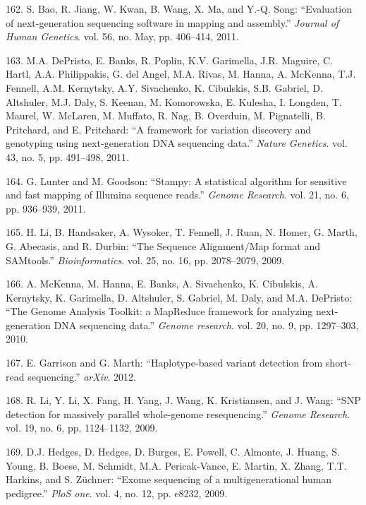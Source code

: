 \documentclass[12pt,a4paper,twoside]{ugathesis}
\theoremstyle{definition}
\theoremstyle{definition}
\theoremstyle{definition}
\theoremstyle{remark}
\begin{document}
\hypertarget{ref-Bao2011}{}
162. S. Bao, R. Jiang, W. Kwan, B. Wang, X. Ma, and Y.-Q. Song:
``Evaluation of next-generation sequencing software in mapping and
assembly.'' \emph{Journal of Human Genetics}. vol. 56, no. May, pp.
406--414, 2011.

\hypertarget{ref-DePristo2011}{}
163. M.A. DePristo, E. Banks, R. Poplin, K.V. Garimella, J.R. Maguire,
C. Hartl, A.A. Philippakis, G. del Angel, M.A. Rivas, M. Hanna, A.
McKenna, T.J. Fennell, A.M. Kernytsky, A.Y. Sivachenko, K. Cibulskis,
S.B. Gabriel, D. Altshuler, M.J. Daly, S. Keenan, M. Komorowska, E.
Kulesha, I. Longden, T. Maurel, W. McLaren, M. Muffato, R. Nag, B.
Overduin, M. Pignatelli, B. Pritchard, and E. Pritchard: ``A framework
for variation discovery and genotyping using next-generation DNA
sequencing data.'' \emph{Nature Genetics}. vol. 43, no. 5, pp. 491--498,
2011.

\hypertarget{ref-Lunter2011}{}
164. G. Lunter and M. Goodson: ``Stampy: A statistical algorithm for
sensitive and fast mapping of Illumina sequence reads.'' \emph{Genome
Research}. vol. 21, no. 6, pp. 936--939, 2011.

\hypertarget{ref-Li2009}{}
165. H. Li, B. Handsaker, A. Wysoker, T. Fennell, J. Ruan, N. Homer, G.
Marth, G. Abecasis, and R. Durbin: ``The Sequence Alignment/Map format
and SAMtools.'' \emph{Bioinformatics}. vol. 25, no. 16, pp. 2078--2079,
2009.

\hypertarget{ref-McKenna2010}{}
166. A. McKenna, M. Hanna, E. Banks, A. Sivachenko, K. Cibulskis, A.
Kernytsky, K. Garimella, D. Altshuler, S. Gabriel, M. Daly, and M.A.
DePristo: ``The Genome Analysis Toolkit: a MapReduce framework for
analyzing next-generation DNA sequencing data.'' \emph{Genome research}.
vol. 20, no. 9, pp. 1297--303, 2010.

\hypertarget{ref-Garrison2012}{}
167. E. Garrison and G. Marth: ``Haplotype-based variant detection from
short-read sequencing.'' \emph{arXiv}. 2012.

\hypertarget{ref-Li2009c}{}
168. R. Li, Y. Li, X. Fang, H. Yang, J. Wang, K. Kristiansen, and J.
Wang: ``SNP detection for massively parallel whole-genome
resequencing.'' \emph{Genome Research}. vol. 19, no. 6, pp. 1124--1132,
2009.

\hypertarget{ref-Hedges2009}{}
169. D.J. Hedges, D. Hedges, D. Burges, E. Powell, C. Almonte, J. Huang,
S. Young, B. Boese, M. Schmidt, M.A. Pericak-Vance, E. Martin, X. Zhang,
T.T. Harkins, and S. Züchner: ``Exome sequencing of a multigenerational
human pedigree.'' \emph{PloS one}. vol. 4, no. 12, pp. e8232, 2009.
\end{document}
